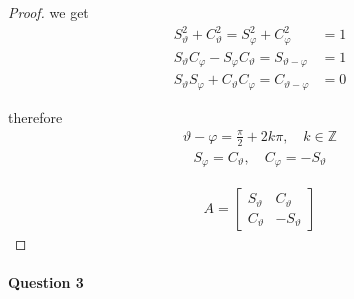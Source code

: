 \documentclass[11pt,a4paper]{article}
\begin{document}
\begin{enumerate}
\begin{proof}
we get
\begin{align}
S^2_\vartheta+C^2_\vartheta=S^2_\varphi+C^2_\varphi&=1 \\
S_\vartheta C_\varphi-S_\varphi C_\vartheta=S_{\vartheta-\varphi}&=1 \\
S_\vartheta S_\varphi+C_\vartheta C_\varphi=C_{\vartheta-\varphi}&=0
\end{align}

therefore
\begin{align}
\vartheta-\varphi=\frac{\pi}{2}+2k\pi,\hspace{1em}k\in\mathbb{Z}
\end{align}
\begin{align}
S_\varphi=C_\vartheta,\hspace{1em}
C_\varphi=-S_\vartheta
\end{align}

\begin{align*}
A=
\begin{bmatrix}
S_\vartheta & C_\vartheta \\
C_\vartheta & -S_\vartheta
\end{bmatrix}
\end{align*}

\end{proof}

\end{enumerate}

\newpage

\paragraph{Question 3}
\end{document}
